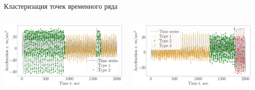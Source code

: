 \documentclass[10pt,pdf,hyperref={unicode}]{beamer}
\begin{document}
\begin{frame}[shrink=5]{Кластеризация точек временного ряда}

\begin{columns}
    \begin{column}{0.5\textwidth}
        \includegraphics[width=1\textwidth]{results/2_patern_2_claster_vector}
    \end{column}
    \begin{column}{0.5\textwidth}
        \includegraphics[width=1\textwidth]{results/3_patern_2_claster_vector}
    \end{column}
\end{columns}


\end{frame}
\end{document}
